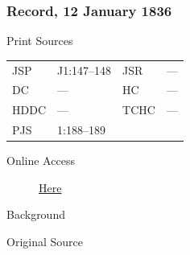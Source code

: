 		\subsubsection{Record, 12 January 1836}
			\label{EMS-1836-JS-12-JAN-1836}
			
			\begin{description}
					\item[Print Sources]
				\end{description}

					\begin{tabular}{p{0.5in}p{1in}p{0.5in}p{1in}}
					JSP	 	& J1:147--148		& JSR 		& --- \\
					DC	 	& ---				& HC 		& --- \\
					HDDC 	& ---				& TCHC 		& --- \\
					PJS 	& 1:188--189			& 	 		&  \\
					\end{tabular}
				
				\begin{description}
					\item[Online Access] \href{https://www.josephsmithpapers.org/paper-summary/journal-1835-1836/105}{Here}
				\end{description}
				
				\begin{description}
					\item[Background]
				\end{description}
				
				
				\begin{description}
					\item[Original Source]
				\end{description}
				
				
